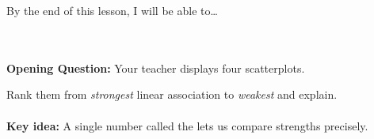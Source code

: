 \documentclass[10pt]{article}
\begin{document}
\namedateperiod

\vspace{0.1in}

\begin{objectivebox}
\small By the end of this lesson, I will be able to\dots\\[4pt]
\writeline\\[1pt]
\writeline\\[1pt]
\writeline
\end{objectivebox}

\vspace{0.08in}

\begin{vocabbox}
\end{vocabbox}

\vspace{0.08in}

\begin{hookbox}
\small\textbf{Opening Question:} Your teacher displays four scatterplots.

\vspace{6pt}
Rank them from \textit{strongest} linear association to \textit{weakest} and explain.\\[8pt]
\writeline\\[1pt]\writeline
\vspace{4pt}
\textbf{Key idea:} A single number called the \blank{5cm} lets us compare strengths precisely.
\end{hookbox}

\vspace{0.08in}
\end{document}
